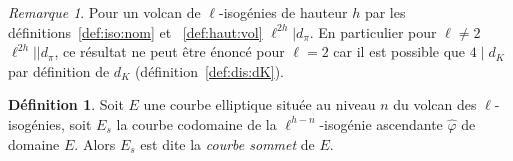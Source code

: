 \documentclass[10pt,a4paper]{book}
\theoremstyle{plain}
\theoremstyle{definition}
\theoremstyle{definition}
\theoremstyle{definition}
\theoremstyle{definition}
\theoremstyle{definition}
\newtheorem{defi}[thm]{Définition}
\theoremstyle{remark}
\newtheorem{rem}[thm]{Remarque}
\theoremstyle{remark}
\theoremstyle{definition}
\begin{document}
\begin{rem} 
\label{rem:lie:dp:dk}
Pour un volcan de $\ell$-isogénies de hauteur $h$ par les 
définitions~\ref{def:iso:nom} et ~\ref{def:haut:vol} $\ell^{2h} | d_{\pi}$.
En particulier pour $\ell \neq 2$ $\ell^{2h}||d_{\pi}$, ce résultat ne peut être 
énoncé  pour $\ell=2$ car il est possible que $4 \mid d_K$ par définition de $d_K$
(définition~\ref{def:dis:dK}).
\end{rem}

\begin{defi}
\label{def:cou:som}
Soit $E$ une courbe elliptique située au niveau $n$ du volcan des $\ell$-isogénies, soit $E_s$ la courbe codomaine de la $\ell^{h-n}$-isogénie ascendante $\widehat{\varphi}$ de domaine $E$. Alors $E_s$ est dite la \emph{courbe sommet} de $E$. 
\end{defi}
\end{document}
